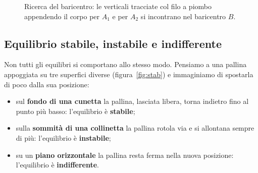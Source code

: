 \begin{figure}[h!]
\centering
{}
\caption{Ricerca del baricentro: le verticali tracciate col filo a piombo appendendo il corpo per $A_1$ e per $A_2$ si incontrano nel baricentro $B$.}
\label{fig:baricentro}
\end{figure}

\subsection{Equilibrio stabile, instabile e indifferente}
Non tutti gli equilibri si comportano allo stesso modo. Pensiamo a una pallina appoggiata su tre superfici diverse (figura~\ref{fig:stab}) e immaginiamo di spostarla di poco dalla sua posizione:
\begin{itemize}
\item sul \textbf{fondo di una cunetta} la pallina, lasciata libera, torna indietro fino al punto più basso: l'equilibrio è \textbf{stabile};
\item sulla \textbf{sommità di una collinetta} la pallina rotola via e si allontana sempre di più: l'equilibrio è \textbf{instabile};
\item su un \textbf{piano orizzontale} la pallina resta ferma nella nuova posizione: l'equilibrio è \textbf{indifferente}.
\end{itemize}

